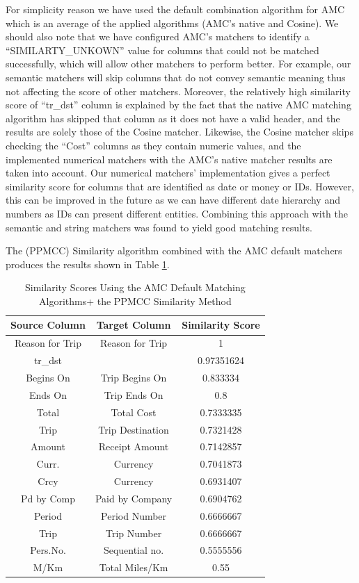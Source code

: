 \documentclass{../../Util/LaTEX/sig-alternate}
\begin{document}
For simplicity reason we have used the default combination algorithm for AMC which is an average of the applied algorithms (AMC's native and Cosine). We should also note that we have configured AMC's matchers to identify a ``SIMILARTY\_UNKOWN'' value for columns that could not be matched successfully, which will allow other matchers to perform better. For example, our semantic matchers will skip columns that do not convey semantic meaning thus not affecting the score of other matchers. Moreover, the relatively high similarity score of ``tr\_dst'' column is explained by the fact that the native AMC matching algorithm has skipped that column as it does not have a valid header, and the results are solely those of the Cosine matcher. Likewise, the Cosine matcher skips checking the ``Cost'' columns as they contain numeric values, and the implemented numerical matchers with the AMC's native matcher results are taken into account. Our numerical matchers' implementation gives a perfect similarity score for columns that are identified as date or money or IDs. However, this can be improved in the future as we can have different date hierarchy and numbers as IDs can present different entities. Combining this approach with the semantic and string matchers was found to yield good matching results.

The (PPMCC) Similarity algorithm combined with the AMC default matchers produces the results shown in Table \ref{tab:Similarity_Scores_Using_the_AMC_Default_Matching_Algorithms+__the_PPMCC_Similarity_Method}.

\begin{table}[ht]
\centering
\begin{tabular}{|c|c|c|}\hline
\textbf{Source Column} & \textbf{Target Column} & \textbf{Similarity Score} \\ \hline
Reason for Trip & Reason for Trip & 1 \\ \hline
tr\_dst &  & 0.97351624 \\ \hline
Begins On & Trip Begins On & 0.833334 \\ \hline
Ends On & Trip Ends On & 0.8 \\ \hline
Total & Total Cost & 0.7333335 \\ \hline
Trip & Trip Destination & 0.7321428 \\ \hline
Amount & Receipt Amount & 0.7142857 \\ \hline
Curr. & Currency & 0.7041873 \\ \hline
Crcy & Currency & 0.6931407 \\ \hline
Pd by Comp & Paid by Company & 0.6904762 \\ \hline
Period & Period Number & 0.6666667 \\ \hline
Trip & Trip Number & 0.6666667 \\ \hline
Pers.No. & Sequential no. & 0.5555556 \\ \hline
M/Km & Total Miles/Km & 0.55 \\ \hline
\end{tabular}
\caption{Similarity Scores Using the AMC Default Matching Algorithms+  the PPMCC Similarity Method}
\label{tab:Similarity_Scores_Using_the_AMC_Default_Matching_Algorithms+__the_PPMCC_Similarity_Method}
\end{table}
\end{document}
